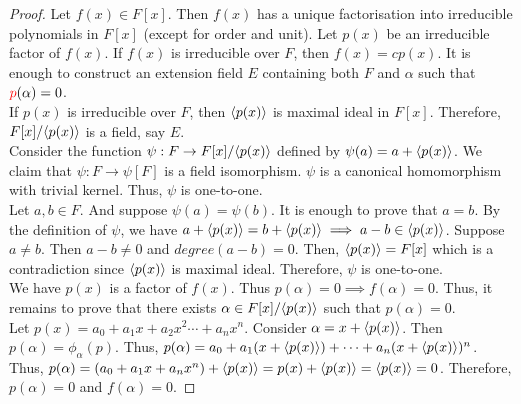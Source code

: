 \begin{proof}
	Let $f(x) \in F[x]$.
	Then $f(x)$ has a unique factorisation into irreducible polynomials in $F[x]$ (except for order and unit).
	Let $p(x)$ be an irreducible factor of $f(x)$.
	If $f(x)$ is irreducible over $F$, then $f(x) = cp(x)$.
	It is enough to construct an extension field $E$ containing both $F$ and $\alpha$ such that ${\color{red}p}(\alpha) = 0$.\\

	If $p(x)$ is irreducible over $F$, then $\langle p(x)\rangle$ is maximal ideal in $F[x]$.
	Therefore, $F[x]/\langle p(x)\rangle$ is a field, say $E$.\\

	Consider the function $\psi : F \to F[x]/\langle p(x)\rangle$ defined by $\psi(a) = a+\langle p(x)\rangle$.
	We claim that $\psi : F \to \psi[F]$ is a field isomorphism.
	$\psi$ is a canonical homomorphism with trivial kernel. Thus, $\psi$ is one-to-one.\\

	Let $a,b \in F$.
	And suppose $\psi(a) = \psi(b)$.
	It is enough to prove that $a = b$.
	By the definition of $\psi$, we have $a+\langle p(x)\rangle = b + \langle p(x)\rangle \implies a-b \in \langle p(x)\rangle$.
	Suppose $a \ne b$.
	Then $a-b \ne 0$ and $degree(a-b) = 0$.
	Then, $\langle p(x)\rangle = F[x]$ which is a contradiction since $\langle p(x)\rangle$ is maximal ideal.
	Therefore, $\psi$ is one-to-one.\\
	
	We have $p(x)$ is a factor of $f(x)$.
	Thus $p(\alpha) = 0 \implies f(\alpha) = 0$.
	Thus, it remains to prove that there exists $\alpha \in F[x]/\langle p(x)\rangle$ such that $p(\alpha) = 0$.\\

	Let $p(x) = a_0 + a_1x + a_2 x^2\cdots + a_n x^n$.
	Consider $\alpha = x + \langle p(x)\rangle$.
	Then $p(\alpha) = \phi_\alpha(p)$.
	Thus, $p(\alpha) = a_0 + a_1(x+\langle p(x)\rangle) + \cdots + a_n(x + \langle p(x)\rangle)^n$.
	Thus, $p(\alpha) = (a_0+a_1x + a_n x^n) + \langle p(x)\rangle = p(x) + \langle p(x)\rangle = \langle p(x)\rangle = 0$.
	Therefore, $p(\alpha) = 0$ and $f(\alpha) = 0$.
\end{proof}


